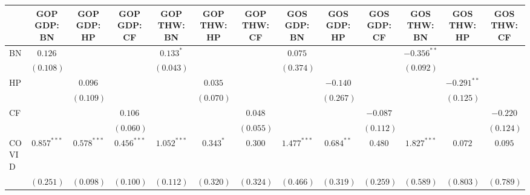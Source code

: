 
\usepackage{booktabs}

\begin{table}
\begin{center}
\begin{tabular}{l c c c c c c c c c c c c}
\toprule
 & GOP GDP: BN & GOP GDP: HP & GOP GDP: CF & GOP THW: BN & GOP THW: HP & GOP THW: CF & GOS GDP: BN & GOS GDP: HP & GOS GDP: CF & GOS THW: BN & GOS THW: HP & GOS THW: CF \\
\midrule
BN                & $0.126$        &                &                & $0.133^{*}$    &                &                & $0.075$        &                &                & $-0.356^{**}$  &                &                \\
                  & $(0.108)$      &                &                & $(0.043)$      &                &                & $(0.374)$      &                &                & $(0.092)$      &                &                \\
HP                &                & $0.096$        &                &                & $0.035$        &                &                & $-0.140$       &                &                & $-0.291^{**}$  &                \\
                  &                & $(0.109)$      &                &                & $(0.070)$      &                &                & $(0.267)$      &                &                & $(0.125)$      &                \\
CF                &                &                & $0.106$        &                &                & $0.048$        &                &                & $-0.087$       &                &                & $-0.220$       \\
                  &                &                & $(0.060)$      &                &                & $(0.055)$      &                &                & $(0.112)$      &                &                & $(0.124)$      \\
COVID             & $0.857^{***}$  & $0.578^{***}$  & $0.456^{***}$  & $1.052^{***}$  & $0.343^{*}$    & $0.300$        & $1.477^{***}$  & $0.684^{**}$   & $0.480$        & $1.827^{***}$  & $0.072$        & $0.095$        \\
                  & $(0.251)$      & $(0.098)$      & $(0.100)$      & $(0.112)$      & $(0.320)$      & $(0.324)$      & $(0.466)$      & $(0.319)$      & $(0.259)$      & $(0.589)$      & $(0.803)$      & $(0.789)$      \\

\end{tabular}
\end{center}
\end{table}
